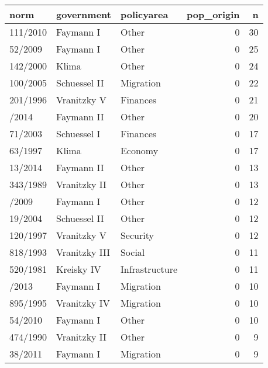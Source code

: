 
\begin{tabular}{lllrr}
\toprule
norm & government & policyarea & pop\_origin & n\\
\midrule
111/2010 & Faymann I & Other & 0 & 30\\
52/2009 & Faymann I & Other & 0 & 25\\
142/2000 & Klima & Other & 0 & 24\\
100/2005 & Schuessel II & Migration & 0 & 22\\
201/1996 & Vranitzky V & Finances & 0 & 21\\
\addlinespace
92/2014 & Faymann II & Other & 0 & 20\\
71/2003 & Schuessel I & Finances & 0 & 17\\
63/1997 & Klima & Economy & 0 & 17\\
13/2014 & Faymann II & Other & 0 & 13\\
343/1989 & Vranitzky II & Other & 0 & 13\\
\addlinespace
135/2009 & Faymann I & Other & 0 & 12\\
19/2004 & Schuessel II & Other & 0 & 12\\
120/1997 & Vranitzky V & Security & 0 & 12\\
818/1993 & Vranitzky III & Social & 0 & 11\\
520/1981 & Kreisky IV & Infrastructure & 0 & 11\\
\addlinespace
33/2013 & Faymann I & Migration & 0 & 10\\
895/1995 & Vranitzky IV & Migration & 0 & 10\\
54/2010 & Faymann I & Other & 0 & 10\\
474/1990 & Vranitzky II & Other & 0 & 9\\
38/2011 & Faymann I & Migration & 0 & 9\\
\bottomrule
\end{tabular}
